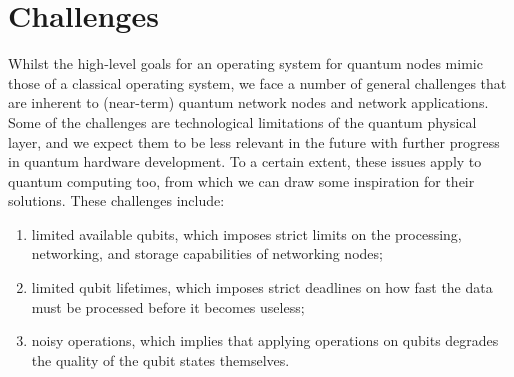 \section{Challenges}
\label{sec:background:challenges}

Whilst the high-level goals for an operating system for quantum nodes mimic those of a classical
operating system, we face a number of general challenges that are inherent to (near-term) quantum
network nodes and network applications. Some of the challenges are technological limitations of the
quantum physical layer, and we expect them to be less relevant in the future with further progress
in quantum hardware development. To a certain extent, these issues apply to quantum computing too,
from which we can draw some inspiration for their solutions. These challenges include:
%
\begin{enumerate}
    \item limited available qubits, which imposes strict limits on the processing, networking, and
          storage capabilities of networking nodes;
    \item limited qubit lifetimes, which imposes strict deadlines on how fast the data must be
          processed before it becomes useless;
    \item noisy operations, which implies that applying operations on qubits degrades the quality of
          the qubit states themselves.
\end{enumerate}

